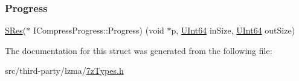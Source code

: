 \subsubsection{\texorpdfstring{Progress}{Progress}}
{\footnotesize\ttfamily \mbox{\hyperlink{7z_types_8h_acc0053eeb62726b68b22e8c7d9e91367}{S\+Res}}($\ast$ I\+Compress\+Progress\+::\+Progress) (void $\ast$p, \mbox{\hyperlink{7z_types_8h_aabaf3d1eda66282f591e56707437c48e}{U\+Int64}} in\+Size, \mbox{\hyperlink{7z_types_8h_aabaf3d1eda66282f591e56707437c48e}{U\+Int64}} out\+Size)}



The documentation for this struct was generated from the following file\+:\begin{DoxyCompactItemize}
\item 
src/third-\/party/lzma/\mbox{\hyperlink{7z_types_8h}{7z\+Types.\+h}}\end{DoxyCompactItemize}
